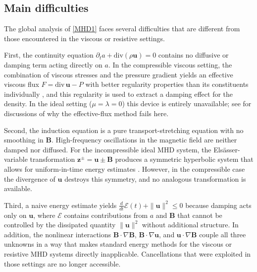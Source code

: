 \documentclass[12pt, reqno]{amsart}
\numberwithin{equation}{section}
\numberwithin{equation}{section}
\numberwithin{equation}{section}
\numberwithin{equation}{section}
\theoremstyle{remark}
\def\b{ \mathbf{B} }
\begin{document}
\subsection{Main difficulties}

The global analysis of \eqref{MHD1} faces several difficulties
that are different from those encountered in the viscous or resistive settings.

\medskip
First, the continuity equation $\partial_t a + \mathrm{div}(\rho\mathbf{u})=0$
contains no diffusive or damping term acting directly on $a$.  In the
compressible viscous setting, the combination of viscous stresses
and the pressure gradient yields an effective viscous flux
$F = \mathrm{div}\,\mathbf{u} - P$ with better regularity properties than
its constituents individually \cite{HS2,DH1}, and this regularity
is used to extract a damping effect for the density.  In the ideal
setting ($\mu=\lambda=0$) this device is entirely unavailable; see
\cite{Dong-Wu-Zhai,Wu-Wu} for discussions of why the effective-flux
method fails here.

\medskip
Second, the induction equation
is a pure transport-stretching equation with no smoothing in $\b$.
High-frequency oscillations in the magnetic field are neither damped nor
diffused.  For the incompressible ideal MHD system, the
Els\"{a}sser-variable transformation $\mathbf{z}^\pm = \mathbf{u}\pm\b$
produces a symmetric hyperbolic system that allows for uniform-in-time energy estimates
\cite{BSS,Cai,HXY}. However,  in the compressible case the divergence of $\mathbf{u}$
destroys this symmetry, and no analogous transformation is available. %

\medskip
Third,  a naive energy estimate yields
$\frac{d}{dt}\mathcal{E}(t) + \|\mathbf{u}\|^2 \leq 0$ because damping acts only on $\mathbf{u}$,  where
$\mathcal{E}$ contains contributions from $a$ and $\b$ that
cannot be controlled by the dissipated quantity $\|\mathbf{u}\|^2$
without additional structure. In addition,
the nonlinear interactions $\b\cdot\nabla\b$,
$\b\cdot\nabla\mathbf{u}$, and $\mathbf{u}\cdot\nabla\b$
couple all three unknowns in a way that makes standard energy methods for
the viscous or resistive MHD systems
\cite{Dong-Wu-Zhai,L-X-Z,Li-Xu-Zhai,L-H,L-H1,Suen,SuenA,Wu-Xu-Zhai,Wu-Zhai,Wu-Zhu}
directly inapplicable. Cancellations that were exploited in those settings
are no longer accessible.
\end{document}
